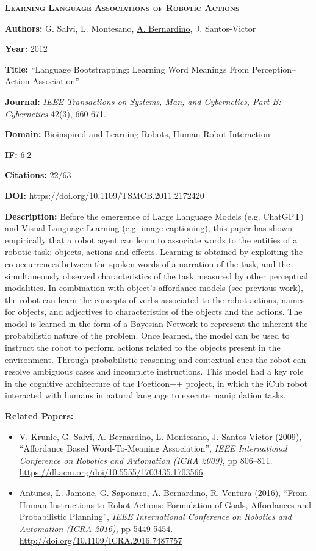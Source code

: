 \clearpage

\textbf{\textsc{\ul{Learning Language Associations of Robotic Actions}}}

\textbf{Authors:} G. Salvi, L. Montesano, \ul{A. Bernardino}, J.
Santos-Victor

\textbf{Year:} 2012

\textbf{Title:} ``Language Bootstrapping: Learning Word Meanings From
Perception--Action Association''

\textbf{Journal:} \emph{IEEE Transactions on Systems, Man, and
Cybernetics, Part B: Cybernetics} 42(3), 660-671.

\textbf{Domain:} Bioinspired and Learning Robots, Human-Robot
Interaction

\textbf{IF:} 6.2

\textbf{Citations:} 22/63

\textbf{DOI:} \url{https://doi.org/10.1109/TSMCB.2011.2172420}

\textbf{Description:} Before the emergence of Large Language Models
(e.g. ChatGPT) and Visual-Language Learning (e.g. image captioning),
this paper has shown empirically that a robot agent can learn to
associate words to the entities of a robotic task: objects, actions and
effects. Learning is obtained by exploiting the co-occurrences between
the spoken words of a narration of the task, and the simultaneously
observed characteristics of the task measured by other perceptual
modalities. In combination with object's affordance models (see previous
work), the robot can learn the concepts of verbs associated to the robot
actions, names for objects, and adjectives to characteristics of the
objects and the actions. The model is learned in the form of a Bayesian
Network to represent the inherent the probabilistic nature of the
problem. Once learned, the model can be used to instruct the robot to
perform actions related to the objects present in the environment.
Through probabilistic reasoning and contextual cues the robot can
resolve ambiguous cases and incomplete instructions. This model had a
key role in the cognitive architecture of the Poeticon++ project, in
which the iCub robot interacted with humans in natural language to
execute manipulation tasks.

\textbf{Related Papers:}

\begin{itemize}
\item
  V. Krunic, G. Salvi, \ul{A. Bernardino}, L. Montesano, J.
  Santos-Victor (2009), ``Affordance Based Word-To-Meaning
  Association'', \emph{IEEE International Conference on Robotics and
  Automation (ICRA 2009)}, pp 806--811.
  \url{https://dl.acm.org/doi/10.5555/1703435.1703566}
\item
  Antunes, L. Jamone, G. Saponaro, \ul{A. Bernardino}, R. Ventura
  (2016), ``From Human Instructions to Robot Actions: Formulation of
  Goals, Affordances and Probabilistic Planning'', \emph{IEEE
  International Conference on Robotics and Automation (ICRA 2016),} pp
  5449-5454. \url{http://doi.org/10.1109/ICRA.2016.7487757}
\end{itemize}

